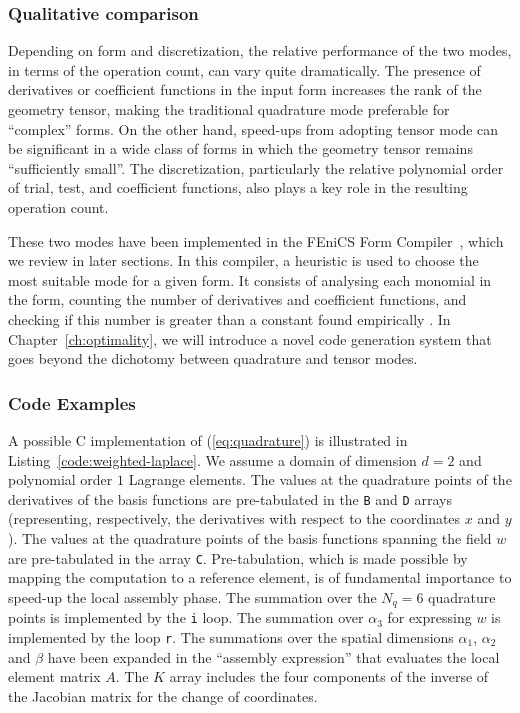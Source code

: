 \subsubsection{Qualitative comparison}
Depending on form and discretization, the relative performance of the two modes, in terms of the operation count, can vary quite dramatically. The presence of derivatives or coefficient functions in the input form increases the rank of the geometry tensor, making the traditional quadrature mode preferable for ``complex'' forms. On the other hand, speed-ups from adopting tensor mode can be significant in a wide class of forms in which the geometry tensor remains ``sufficiently small''. The discretization, particularly the relative polynomial order of trial, test, and coefficient functions, also plays a key role in the resulting operation count. 

These two modes have been implemented in the FEniCS Form Compiler~\citep{FFC-TC}, which we review in later sections. In this compiler, a heuristic is used to choose the most suitable mode for a given form. It consists of analysing each monomial in the form, counting the number of derivatives and coefficient functions, and checking if this number is greater than a constant found empirically \citep{Fenics}. In Chapter~\ref{ch:optimality}, we will introduce a novel code generation system that goes beyond the dichotomy between quadrature and tensor modes.


\subsubsection{Code Examples}
\label{sec:bkg:mathcode}
A possible C implementation of (\ref{eq:quadrature}) is illustrated in Listing~\ref{code:weighted-laplace}. We assume a domain of dimension $d=2$ and polynomial order $1$ Lagrange elements. The values at the quadrature points of the derivatives of the basis functions are pre-tabulated in the \texttt{B} and \texttt{D} arrays (representing, respectively, the derivatives with respect to the coordinates $x$ and $y$). The values at the quadrature points of the basis functions spanning the field $w$ are pre-tabulated in the array \texttt{C}. Pre-tabulation, which is made possible by mapping the computation to a reference element, is of fundamental importance to speed-up the local assembly phase. The summation over the $N_q = 6$ quadrature points is implemented by the \texttt{i} loop. The summation over $\alpha_3$ for expressing $w$ is implemented by the loop \texttt{r}. The summations over the spatial dimensions $\alpha_1$, $\alpha_2$ and $\beta$ have been expanded in the ``assembly expression'' that evaluates the local element matrix $A$. The $K$ array includes the four components of the inverse of the Jacobian matrix for the change of coordinates. 

